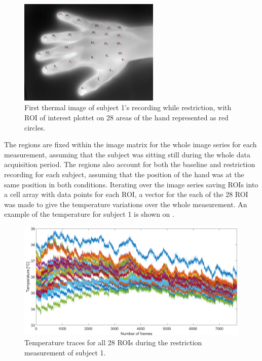 \begin{figure}[H]
	\includegraphics[width=0.6\textwidth]{figures/roiHand}  %
	\caption{First thermal image of subject 1's recording while restriction, with ROI of interest plottet on 28 areas of the hand represented as red circles.}
	\label{fig:roiHand}  %
\end{figure}

The regions are fixed within the image matrix for the whole image series for each measurement, assuming that the subject was sitting still during the whole data acquisition period. The regions also account for both the baseline and restriction recording for each subject, assuming that the position of the hand was at the same position in both conditions. 
Iterating over the image series saving ROIs into a cell array with data points for each ROI, a vector for the each of the 28 ROI was made to give the temperature variations over the whole measurement. 
An example of the temperature for subject 1 is shown on .

\begin{figure}[H]
	\includegraphics[width=1\textwidth]{figures/Intensities}  %
	\caption{Temperature traces for all 28 ROIs during the restriction measurement of subject 1.}
	\label{fig:Intensities}  %
\end{figure}


